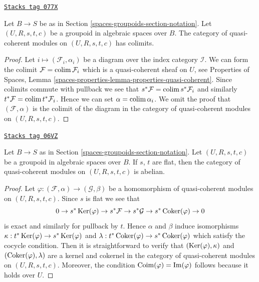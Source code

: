 \begin{lemma}[Colimits]
\label{spaces-groupoids-lemma-colimits}
\href{https://stacks.math.columbia.edu/tag/077X}{\texttt{Stacks tag 077X}}

Let $B \to S$ be as in Section \ref{spaces-groupoids-section-notation}.
Let $(U, R, s, t, c)$ be a groupoid in algebraic spaces over $B$.
The category of quasi-coherent modules on $(U, R, s, t, c)$ has colimits.
\end{lemma}

\begin{proof}
Let $i \mapsto (\mathcal{F}_i, \alpha_i)$ be a diagram over the index
category $\mathcal{I}$. We can form the colimit
$\mathcal{F} = \operatorname{colim} \mathcal{F}_i$
which is a quasi-coherent sheaf on $U$, see
Properties of Spaces, Lemma
\ref{spaces-properties-lemma-properties-quasi-coherent}.
Since colimits commute with pullback we see that
$s^*\mathcal{F} = \operatorname{colim} s^*\mathcal{F}_i$ and similarly
$t^*\mathcal{F} = \operatorname{colim} t^*\mathcal{F}_i$. Hence we can set
$\alpha = \operatorname{colim} \alpha_i$. We omit the proof that $(\mathcal{F}, \alpha)$
is the colimit of the diagram in the category of quasi-coherent modules
on $(U, R, s, t, c)$.
\end{proof}

\begin{lemma}[Abelian]
\label{spaces-groupoids-lemma-abelian}
\href{https://stacks.math.columbia.edu/tag/06VZ}{\texttt{Stacks tag 06VZ}}

Let $B \to S$ as in Section \ref{spaces-groupoids-section-notation}.
Let $(U, R, s, t, c)$ be a groupoid in algebraic spaces over $B$.
If $s$, $t$ are flat, then the category of quasi-coherent modules on
$(U, R, s, t, c)$ is abelian.
\end{lemma}

\begin{proof}
Let $\varphi : (\mathcal{F}, \alpha) \to (\mathcal{G}, \beta)$ be a
homomorphism of quasi-coherent modules on $(U, R, s, t, c)$. Since $s$ is flat
we see that
$$
0 \to s^*\operatorname{Ker}(\varphi)
\to s^*\mathcal{F} \to s^*\mathcal{G} \to s^*\operatorname{Coker}(\varphi) \to 0
$$
is exact and similarly for pullback by $t$. Hence $\alpha$ and $\beta$
induce isomorphisms
$\kappa : t^*\operatorname{Ker}(\varphi) \to s^*\operatorname{Ker}(\varphi)$ and
$\lambda : t^*\operatorname{Coker}(\varphi) \to s^*\operatorname{Coker}(\varphi)$
which satisfy the cocycle condition. Then it is straightforward to
verify that $(\operatorname{Ker}(\varphi), \kappa)$ and
$(\operatorname{Coker}(\varphi), \lambda)$ are a kernel and cokernel in the
category of quasi-coherent modules on $(U, R, s, t, c)$. Moreover,
the condition $\operatorname{Coim}(\varphi) = \operatorname{Im}(\varphi)$ follows
because it holds over $U$.
\end{proof}

